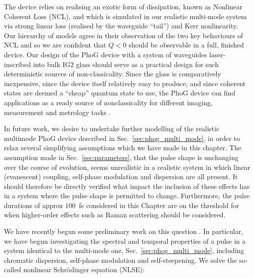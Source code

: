 The device relies on realising an exotic form of dissipation, known as Nonlinear Coherent Loss (NCL), and which is simulated in our realistic multi-mode system via strong linear loss (realised by the waveguide ``tail'') and Kerr nonlinearity. Our hierarchy of models agree in their observation of the two key behaviours of NCL and so we are confident that $Q < 0$ should be observable in a full, finished device. Our design of the PhoG device with a system of waveguides laser-inscribed into bulk IG$2$ glass should serve as a practical design for such deterministic sources of non-classicality. Since the glass is comparatively inexpensive, since the device itself relatively easy to produce, and since coherent states are deemed a ``cheap'' quantum state to use, the PhoG device can find applications as a ready source of nonclassicality for different imaging, measurement and metrology tasks \cite{Taylor2013, Berchera2019}. %

In future work, we desire to undertake further modelling of the realistic multimode PhoG device described in Sec.~\ref{sec:phog_multi_mode}, in order to relax several simplifying assumptions which we have made in this chapter. The assumption made in Sec.~\ref{sec:parameters}, that the pulse shape is unchanging over the course of evolution, seems unrealistic in a realistic system in which linear (evanescent) coupling, self-phase modulation and dispersion are all present. It should therefore be directly verified what impact the inclusion of these effects has in a system where the pulse shape is permitted to change. Furthermore, the pulse durations of approx $100$~fs considered in this Chapter are on the threshold for when higher-order effects such as Raman scattering should be considered.

We have recently begun some preliminary work on this question%
. In particular, we have begun investigating the spectral and temporal properties of a pulse in a system identical to the multi-mode one, Sec.~\ref{sec:phog_multi_mode}, including chromatic dispersion, self-phase modulation and self-steepening. We solve the so-called nonlinear Schr{\"o}dinger equation (NLSE):

